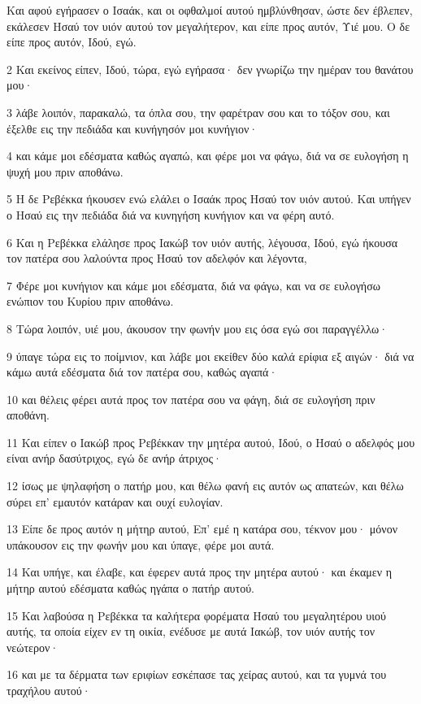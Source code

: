 \par Και αφού εγήρασεν ο Ισαάκ, και οι οφθαλμοί αυτού ημβλύνθησαν, ώστε δεν έβλεπεν, εκάλεσεν Ησαύ τον υιόν αυτού τον μεγαλήτερον, και είπε προς αυτόν, Υιέ μου. Ο δε είπε προς αυτόν, Ιδού, εγώ.
\par 2 Και εκείνος είπεν, Ιδού, τώρα, εγώ εγήρασα· δεν γνωρίζω την ημέραν του θανάτου μου·
\par 3 λάβε λοιπόν, παρακαλώ, τα όπλα σου, την φαρέτραν σου και το τόξον σου, και έξελθε εις την πεδιάδα και κυνήγησόν μοι κυνήγιον·
\par 4 και κάμε μοι εδέσματα καθώς αγαπώ, και φέρε μοι να φάγω, διά να σε ευλογήση η ψυχή μου πριν αποθάνω.
\par 5 Η δε Ρεβέκκα ήκουσεν ενώ ελάλει ο Ισαάκ προς Ησαύ τον υιόν αυτού. Και υπήγεν ο Ησαύ εις την πεδιάδα διά να κυνηγήση κυνήγιον και να φέρη αυτό.
\par 6 Και η Ρεβέκκα ελάλησε προς Ιακώβ τον υιόν αυτής, λέγουσα, Ιδού, εγώ ήκουσα τον πατέρα σου λαλούντα προς Ησαύ τον αδελφόν και λέγοντα,
\par 7 Φέρε μοι κυνήγιον και κάμε μοι εδέσματα, διά να φάγω, και να σε ευλογήσω ενώπιον του Κυρίου πριν αποθάνω.
\par 8 Τώρα λοιπόν, υιέ μου, άκουσον την φωνήν μου εις όσα εγώ σοι παραγγέλλω·
\par 9 ύπαγε τώρα εις το ποίμνιον, και λάβε μοι εκείθεν δύο καλά ερίφια εξ αιγών· διά να κάμω αυτά εδέσματα διά τον πατέρα σου, καθώς αγαπά·
\par 10 και θέλεις φέρει αυτά προς τον πατέρα σου να φάγη, διά σε ευλογήση πριν αποθάνη.
\par 11 Και είπεν ο Ιακώβ προς Ρεβέκκαν την μητέρα αυτού, Ιδού, ο Ησαύ ο αδελφός μου είναι ανήρ δασύτριχος, εγώ δε ανήρ άτριχος·
\par 12 ίσως με ψηλαφήση ο πατήρ μου, και θέλω φανή εις αυτόν ως απατεών, και θέλω σύρει επ' εμαυτόν κατάραν και ουχί ευλογίαν.
\par 13 Είπε δε προς αυτόν η μήτηρ αυτού, Επ' εμέ η κατάρα σου, τέκνον μου· μόνον υπάκουσον εις την φωνήν μου και ύπαγε, φέρε μοι αυτά.
\par 14 Και υπήγε, και έλαβε, και έφερεν αυτά προς την μητέρα αυτού· και έκαμεν η μήτηρ αυτού εδέσματα καθώς ηγάπα ο πατήρ αυτού.
\par 15 Και λαβούσα η Ρεβέκκα τα καλήτερα φορέματα Ησαύ του μεγαλητέρου υιού αυτής, τα οποία είχεν εν τη οικία, ενέδυσε με αυτά Ιακώβ, τον υιόν αυτής τον νεώτερον·
\par 16 και με τα δέρματα των εριφίων εσκέπασε τας χείρας αυτού, και τα γυμνά του τραχήλου αυτού·
